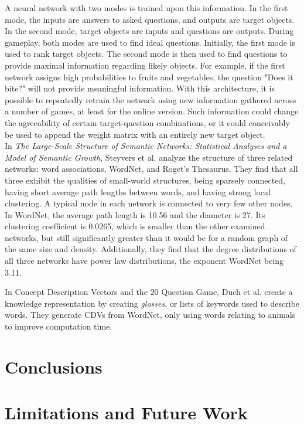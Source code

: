 \documentclass[letterpaper]{article} %
\begin{document}
A neural network with two modes is trained upon this information. In the first mode, the inputs are answers to asked questions, and outputs are target objects. In the second mode, target objects are inputs and questions are outputs. During gameplay, both modes are used to find ideal questions. Initially, the first mode is used to rank target objects. The second mode is then used to find questions to provide maximal information regarding likely objects. For example, if the first network assigns high probabilities to fruits and vegetables, the question "Does it bite?" will not provide meaningful information. With this architecture, it is possible to repeatedly retrain the network using new information gathered across a number of games, at least for the online version. Such information could change the agreeability of certain target-question combinations, or it could conceivably be used to append the weight matrix with an entirely new target object.\\

In \textit{The Large-Scale Structure of Semantic Networks: Statistical Analyses and a Model of Semantic Growth}, Steyvers et al. analyze the structure of three related networks: word associations, WordNet, and Roget's Thesaurus. They find that all three exhibit the qualities of small-world structures, being sparsely connected, having short average path lengths between words, and having strong local clustering. A typical node in each network is connected to very few other nodes. In WordNet, the average path length is 10.56 and the diameter is 27. Its clustering coefficient is 0.0265, which is smaller than the other examined networks, but still significantly greater than it would be for a random graph of the same size and density. Additionally, they find that the degree distributions of all three networks have power law distributions, the exponent WordNet being 3.11. 

In Concept Description Vectors and the 20 Question Game, Duch et al. create a knowledge representation by creating \textit{glosses}, or lists of keywords used to describe words. They generate CDVs from WordNet, only using words relating to animals to improve computation time.

\section{Conclusions}

\section{Limitations and Future Work}




\end{document}
